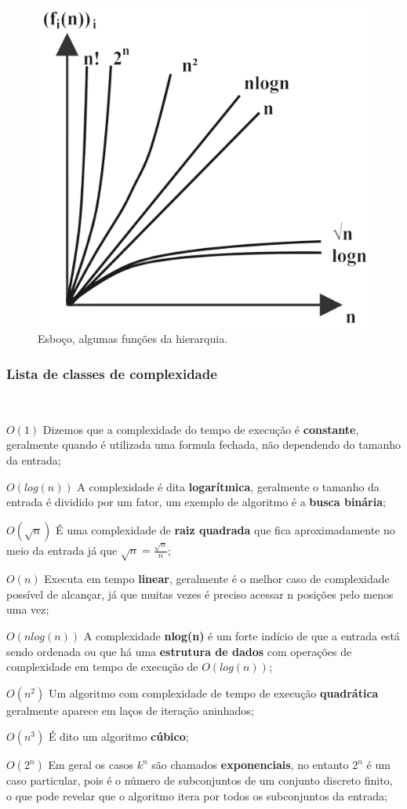 \begin{figure}
  \centering
  \includegraphics[width=0.4\linewidth]{img/Classes.png}
    \caption{Esboço, algumas funções da hierarquia.}
    \label{Hierarquia}
\end{figure}

\subsubsection{Lista de classes de complexidade}
\

$O(1)$ Dizemos que a complexidade do tempo de execução é \textbf{constante}, geralmente quando é utilizada uma formula fechada, não dependendo do tamanho da entrada;

$O(log(n))$ A complexidade é dita \textbf{logarítmica}, geralmente o tamanho da entrada é dividido por um fator, um exemplo de algoritmo é a \textbf{busca binária};

$O(\sqrt{n})$ É uma complexidade de \textbf{raiz quadrada} que fica aproximadamente no meio da entrada já que $\sqrt{n} = \frac{\sqrt{n}}{n}$;

$O(n)$ Executa em tempo \textbf{linear}, geralmente é o melhor caso de complexidade possível de alcançar, já que muitas vezes é preciso acessar n posições pelo menos uma vez;

$O(nlog(n))$ A complexidade \textbf{nlog(n)} é um forte indício de que a entrada está sendo ordenada ou que há uma \textbf{estrutura de dados} com operações de complexidade em tempo de execução de $O(log(n))$;

$O(n^2)$ Um algoritmo com complexidade de tempo de execução \textbf{quadrática} geralmente aparece em laços de iteração aninhados; 

$O(n^3)$ É dito um algoritmo \textbf{cúbico};

$O(2^n)$ Em geral os casos $k^n$ são chamados \textbf{exponenciais}, no entanto $2^n$ é um caso particular, pois é o número de subconjuntos de um conjunto discreto finito, o que pode revelar que o algoritmo itera por todos os subconjuntos da entrada;


